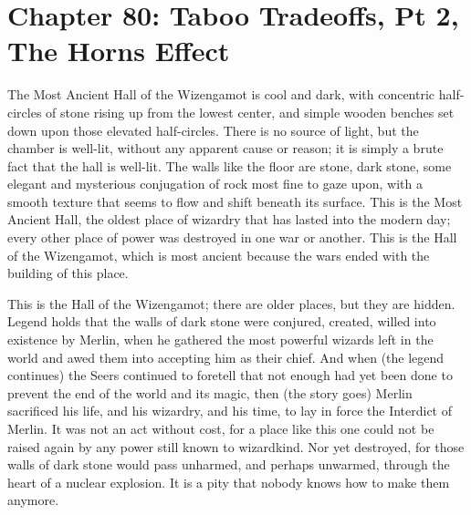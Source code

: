 \chapter{Chapter 80: Taboo Tradeoffs, Pt 2, The Horns Effect}
The Most Ancient Hall of the Wizengamot is cool and dark, with
concentric half-circles of stone rising up from the lowest center, and
simple wooden benches set down upon those elevated half-circles. There
is no source of light, but the chamber is well-lit, without any apparent
cause or reason; it is simply a brute fact that the hall is well-lit.
The walls like the floor are stone, dark stone, some elegant and
mysterious conjugation of rock most fine to gaze upon, with a smooth
texture that seems to flow and shift beneath its surface. This is the
Most Ancient Hall, the oldest place of wizardry that has lasted into the
modern day; every other place of power was destroyed in one war or
another. This is the Hall of the Wizengamot, which is most ancient
because the wars ended with the building of this place.

This is the Hall of the Wizengamot; there are older places, but they are
hidden. Legend holds that the walls of dark stone were conjured,
created, willed into existence by Merlin, when he gathered the most
powerful wizards left in the world and awed them into accepting him as
their chief. And when (the legend continues) the Seers continued to
foretell that not enough had yet been done to prevent the end of the
world and its magic, then (the story goes) Merlin sacrificed his life,
and his wizardry, and his time, to lay in force the Interdict of Merlin.
It was not an act without cost, for a place like this one could not be
raised again by any power still known to wizardkind. Nor yet destroyed,
for those walls of dark stone would pass unharmed, and perhaps unwarmed,
through the heart of a nuclear explosion. It is a pity that nobody knows
how to make them anymore.

